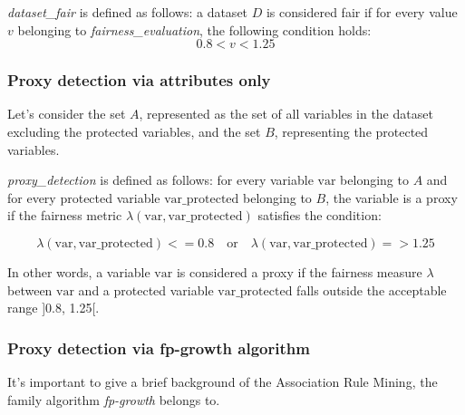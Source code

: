 \documentclass[12pt,a4paper,openright,twoside]{book}
\begin{document}
\textit{dataset\_fair} is defined as follows: a dataset \( D \) is considered fair if for every value \( v \) belonging to \textit{fairness\_evaluation}, the following condition holds:
\[ 0.8  < v < 1.25 \] 

\subsubsection{Proxy detection via attributes only}

Let's consider the set \( A \), represented as the set of all variables in the dataset excluding the protected variables, and the set \( B \), representing the protected variables.

\textit{proxy\_detection} is defined as follows: for every variable \( \text{var} \) belonging to \( A \) and for every protected variable \( \text{var\_protected} \) belonging to \( B \), the variable is a proxy if the fairness metric \( \lambda(\text{var}, \text{var\_protected}) \) satisfies the condition:

\[
\lambda(\text{var}, \text{var\_protected}) <= 0.8 \quad \text{or} \quad \lambda(\text{var}, \text{var\_protected}) => 1.25
\]

In other words, a variable \( \text{var} \) is considered a proxy if the fairness measure \( \lambda \) between \( \text{var} \) and a protected variable \( \text{var\_protected} \) falls outside the acceptable range ]0.8, 1.25[.

\subsubsection{Proxy detection via fp-growth algorithm}

It's important to give a brief background of the Association Rule Mining, the family algorithm \emph{fp-growth} belongs to.
\end{document}
